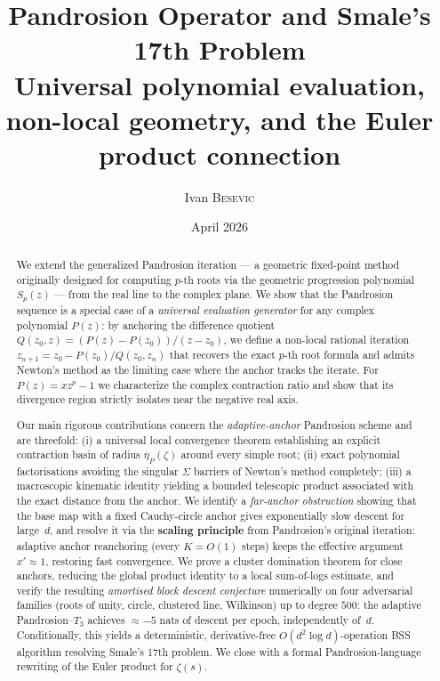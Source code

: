 \documentclass[11pt,a4paper]{article}
\title{\textbf{Pandrosion Operator and Smale's 17th Problem}\\[0.3em]
  \large Universal polynomial evaluation, non-local geometry,
  and the Euler product connection}
\author{Ivan \textsc{Besevic}}
\date{April 2026}
\theoremstyle{definition}
\begin{document}
\maketitle

\begin{abstract}
We extend the generalized Pandrosion iteration --- a geometric fixed-point method originally designed for computing $p$-th roots via the geometric progression polynomial $S_p(z)$ --- from the real line to the complex plane.  We show that the Pandrosion sequence is a special case of a \emph{universal evaluation generator} for any complex polynomial $P(z)$: by anchoring the difference quotient $Q(z_0, z) = (P(z) - P(z_0))/(z - z_0)$, we define a non-local rational iteration $z_{n+1} = z_0 - P(z_0)/Q(z_0, z_n)$ that recovers the exact $p$-th root formula and admits Newton's method as the limiting case where the anchor tracks the iterate.  For $P(z) = xz^p - 1$ we characterize the complex contraction ratio and show that its divergence region strictly isolates near the negative real axis.

Our main rigorous contributions concern the \emph{adaptive-anchor} Pandrosion scheme and are threefold: (i) a universal local convergence theorem establishing an explicit contraction basin of radius $\eta_P(\zeta)$ around every simple root; (ii) exact polynomial factorisations avoiding the singular $\Sigma$ barriers of Newton's method completely; (iii) a macroscopic kinematic identity yielding a bounded telescopic product associated with the exact distance from the anchor. We identify a \emph{far-anchor obstruction} showing that the base map with a fixed Cauchy-circle anchor gives exponentially slow descent for large~$d$, and resolve it via the \textbf{scaling principle} from Pandrosion's original iteration: adaptive anchor reanchoring (every $K = O(1)$ steps) keeps the effective argument $x' \approx 1$, restoring fast convergence.  We prove a cluster domination theorem for close anchors, reducing the global product identity to a local sum-of-logs estimate, and verify the resulting \emph{amortised block descent conjecture} numerically on four adversarial families (roots of unity, circle, clustered line, Wilkinson) up to degree $500$: the adaptive Pandrosion--$T_3$ achieves $\approx -5$ nats of descent per epoch, independently of~$d$.  Conditionally, this yields a deterministic, derivative-free $O(d^2\log d)$-operation BSS algorithm resolving Smale's 17th problem.  We close with a formal Pandrosion-language rewriting of the Euler product for $\zeta(s)$.
\end{abstract}
\end{document}
